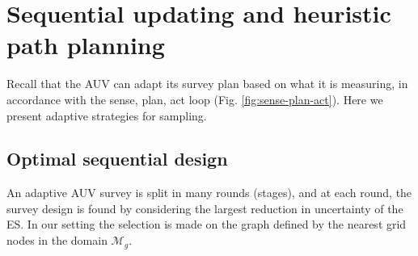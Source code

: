 \documentclass[aoas]{imsart}
\begin{document}





\section{Sequential updating and heuristic path planning}\label{sec:heuristics}

Recall that the AUV can adapt its survey plan based on what it is measuring, in accordance with the sense, plan, act loop (Fig. \ref{fig:sense-plan-act}). Here we present adaptive strategies for sampling.

\subsection{Optimal sequential design}
\label{myopic}

An adaptive AUV survey is split in many rounds (stages), and at each round, the survey design is found by considering the largest reduction in uncertainty of the ES. In our setting the selection is made on the graph defined by the nearest grid nodes in the domain $\mathcal{M}_g$.
\end{document}
